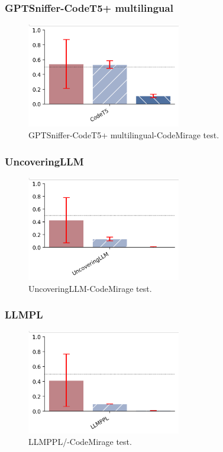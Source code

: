 \subsubsection{GPTSniffer-CodeT5+ multilingual}
\begin{figure}[H]
    \centering
    \includegraphics[width=0.6\textwidth]{img/CodeT5/CodeMirage.png}
    \caption{GPTSniffer-CodeT5+ multilingual-CodeMirage test.}
    \label{fig:GPTSniffer-CodeT5+ multilingual-CodeMirage test}
\end{figure}


\subsubsection{UncoveringLLM}
\begin{figure}[H]
    \centering
    \includegraphics[width=0.6\textwidth]{img/UncoveringLLM/CodeMirage.png}
    \caption{UncoveringLLM-CodeMirage test.}
    \label{fig:UncoveringLLM-CodeMirage test}
\end{figure}



\subsubsection{LLMPL}
\begin{figure}[H]
    \centering
    \includegraphics[width=0.6\textwidth]{img/LLMPPL/CodeMirage.png}
    \caption{LLMPPL/-CodeMirage test.}
    \label{fig:LLMPPL-CodeMirage test}
\end{figure}




